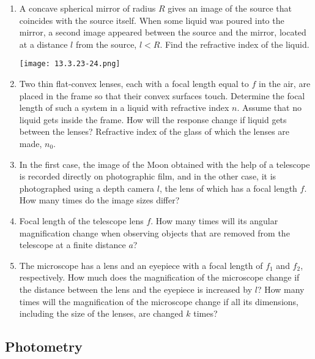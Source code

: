\documentclass{article}
\begin{document}
\begin{enumerate}[label=13.3.\arabic*]
\item A concave spherical mirror of radius $R$ gives an image of the source that coincides with the source itself. When some liquid was poured into the mirror, a second image appeared between the source and the mirror, located at a distance $l$ from the source, $l < R$. Find the refractive index of the liquid.

\begin{center}
    \texttt{[image: 13.3.23-24.png]}
\end{center}

\item Two thin flat-convex lenses, each with a focal length equal to $f$ in the air, are placed in the frame so that their convex surfaces touch. Determine the focal length of such a system in a liquid with refractive index $n$. Assume that no liquid gets inside the frame. How will the response change if liquid gets between the lenses? Refractive index of the glass of which the lenses are made, $n_0$.

\item In the first case, the image of the Moon obtained with the help of a telescope is recorded directly on photographic film, and in the other case, it is photographed using a depth camera $l$, the lens of which has a focal length $f$. How many times do the image sizes differ?

\item Focal length of the telescope lens $f$. How many times will its angular magnification change when observing objects that are removed from the telescope at a finite distance $a$?

\item The microscope has a lens and an eyepiece with a focal length of $f_1$ and $f_2$, respectively. How much does the magnification of the microscope change if the distance between the lens and the eyepiece is increased by $l$? How many times will the magnification of the microscope change if all its dimensions, including the size of the lenses, are changed $k$ times?




\end{enumerate}
\subsection{Photometry}
\end{document}

